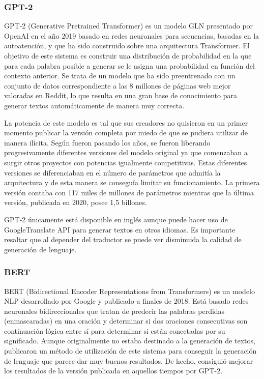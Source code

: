 \subsubsection{GPT-2}
GPT-2 (Generative Pretrained Transformer) es un modelo GLN presentado por OpenAI en el año 2019 basado en redes neuronales para secuencias, basadas en la autoatención, y que ha sido construido sobre una arquitectura Transformer. El objetivo de este sistema es construir una distribución de probabilidad en la que para cada palabra posible a generar se le asigna una probabilidad en función del contexto anterior. Se trata de un modelo que ha sido preentrenado con un conjunto de datos correspondiente a las 8 millones de páginas web mejor valoradas en Reddit, lo que resulta en una gran base de conocimiento para generar textos automáticamente de manera muy correcta.

La potencia de este modelo es tal que sus creadores no quisieron en un primer momento publicar la versión completa por miedo de que se pudiera utilizar de manera ilícita. Según fueron pasando los años, se fueron liberando progresivamente diferentes versiones del modelo original ya que comenzaban a surgir otros proyectos con potencias igualmente competitivas. Estas diferentes versiones se diferenciaban en el número de parámetros que admitía la arquitectura y de esta manera se conseguía limitar su funcionamiento. La primera versión contaba con 117 miles de millones de parámetros mientras que la última versión, publicada en 2020, posee 1,5 billones.

GPT-2 únicamente está disponible en inglés aunque puede hacer uso de GoogleTranslate API para generar textos en otros idiomas. Es importante resaltar que al depender del traductor se puede ver disminuida la calidad de generación de lenguaje.

\subsubsection{BERT}
BERT (Bidirectional Encoder Representations from Transformers) es un modelo NLP desarrollado por Google y publicado a finales de 2018. Está basado redes neuronales bidireccionales que tratan de predecir las palabras perdidas (enmascaradas) en una oración y determinar si dos oraciones consecutivas son continuación lógica entre sí para determinar si están conectadas por su significado. Aunque originalmente no estaba destinado a la generación de textos, \cite{wang-cho-2019-bert} publicaron un método de utilización de este sistema para conseguir la generación de lenguaje que parece dar muy buenos resultados. De hecho, consiguió mejorar los resultados de la versión publicada en aquellos tiempos por GPT-2. 

